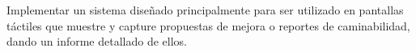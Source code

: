 Implementar un sistema diseñado principalmente para ser utilizado en pantallas táctiles que muestre y capture propuestas de mejora o reportes de caminabilidad, dando un informe detallado de ellos.